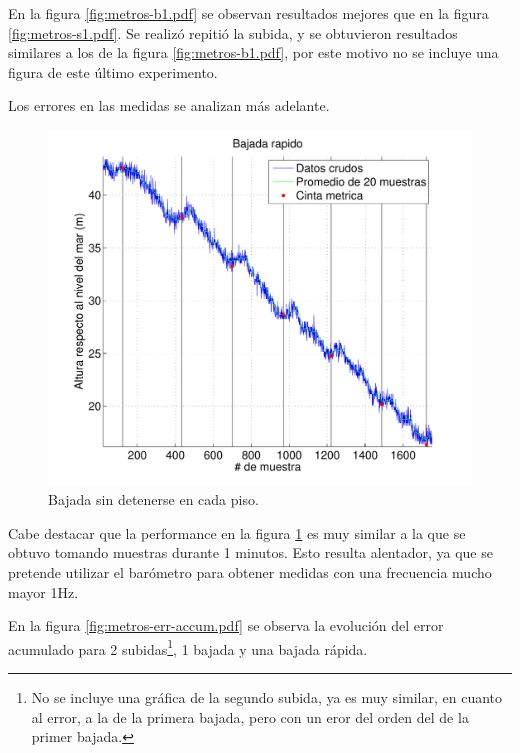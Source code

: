 \documentclass[spanish,12pt,a4paper,titlepage]{report}
\begin{document}
En la figura \ref{fig:metros-b1.pdf} se observan resultados mejores que en la figura \ref{fig:metros-s1.pdf}. Se realizó repitió la subida, y se obtuvieron resultados similares a los de la figura \ref{fig:metros-b1.pdf}, por este motivo no se incluye una figura de este último experimento.

Los errores en las medidas se analizan más adelante.

\newpage
\vspace{-40pt}
\begin{figure}[h!]
\centering
  \includegraphics[width=.95\textwidth]{./pics/metros-rapido.pdf}
\vspace{-15pt}
  \caption{Bajada sin detenerse en cada piso.}
  \label{fig:metros-rapido.pdf}
\vspace{-15pt}
\end{figure}

Cabe destacar que la performance en la figura \ref{fig:metros-rapido.pdf} es muy similar a la que se obtuvo tomando muestras durante 1 minutos. Esto resulta alentador, ya que se pretende utilizar el barómetro para obtener medidas con una frecuencia mucho mayor 1Hz.

En la figura \ref{fig:metros-err-accum.pdf} se observa la evolución del error acumulado para 2 subidas\footnote{No se incluye una gráfica de la segundo subida, ya es muy similar, en cuanto al error, a la de la primera bajada, pero con un eror del orden del de la primer bajada.}, 1 bajada y una bajada rápida.
\end{document}
